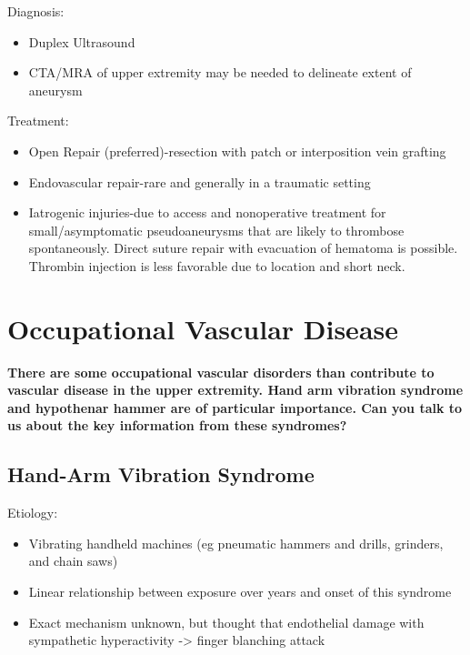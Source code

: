 \documentclass[
]{book}
\begin{document}
Diagnosis:~

\begin{itemize}
\item
  Duplex Ultrasound
\item
  CTA/MRA of upper extremity may be needed to delineate extent of
  aneurysm~
\end{itemize}

Treatment:~

\begin{itemize}
\item
  Open Repair (preferred)-resection with patch or interposition vein
  grafting~~
\item
  Endovascular repair-rare and generally in a traumatic setting
\item
  Iatrogenic injuries-due to access and nonoperative treatment for
  small/asymptomatic pseudoaneurysms that are likely to thrombose
  spontaneously. Direct suture repair with evacuation of hematoma is
  possible. Thrombin injection is less favorable due to location and
  short neck.~
\end{itemize}

\hypertarget{occupational-vascular-disease}{%
\section{Occupational Vascular Disease}\label{occupational-vascular-disease}}

\textbf{There are some occupational vascular disorders than contribute to
vascular disease in the upper extremity. Hand arm vibration syndrome and
hypothenar hammer are of particular importance. Can you talk to us about
the key information from these syndromes?}
\citep{eskandari185ConditionsArising2020}

\hypertarget{hand-arm-vibration-syndrome}{%
\subsection{Hand-Arm Vibration Syndrome~}\label{hand-arm-vibration-syndrome}}

Etiology:

\begin{itemize}
\item
  Vibrating handheld machines (eg pneumatic hammers and drills,
  grinders, and chain saws)~
\item
  Linear relationship between exposure over years and onset of this
  syndrome~
\item
  Exact mechanism unknown, but thought that endothelial damage with
  sympathetic hyperactivity -\textgreater{} finger blanching attack~
\end{itemize}
\end{document}
